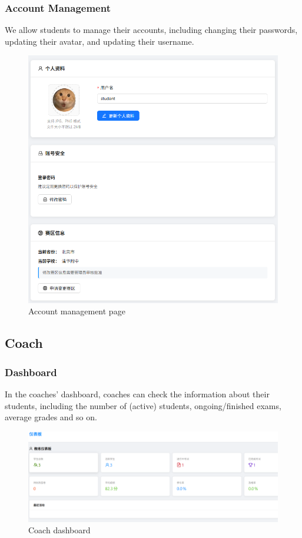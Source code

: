 \documentclass[12pt]{article}
\begin{document}
\subsubsection{Account Management}
We allow students to manage their accounts, including changing their passwords, updating their avatar, and updating their username.
\begin{figure}[H]
    \centering
    \includegraphics[width=\textwidth]{student/account.png}
    \caption{Account management page}
    \label{fig:AccountManagement page}
\end{figure}
\subsection{Coach}
\subsubsection{Dashboard}
In the coaches' dashboard, coaches can check the information about their students, including the number of (active) students, ongoing/finished exams,
average grades and so on.
\begin{figure}[H]
    \centering
    \includegraphics[width=\textwidth]{coach/dashboard.png}
    \caption{Coach dashboard}
    \label{fig:CoachDashboard page}
\end{figure}
\end{document}
